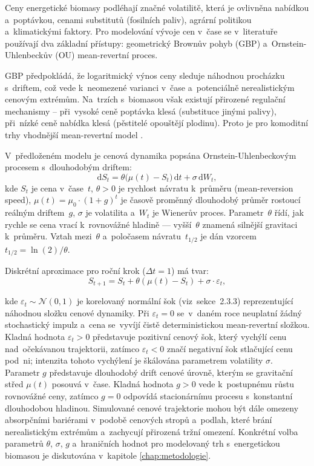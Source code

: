 Ceny energetické biomasy podléhají značné volatilitě, která je ovlivněna nabídkou a~poptávkou, cenami substitutů (fosilních paliv), agrární politikou a~klimatickými faktory. Pro modelování vývoje cen v~čase se v~literatuře používají dva základní přístupy: geometrický Brownův pohyb (GBP) a~Ornstein-Uhlenbeckův (OU) mean-revertní proces.

GBP předpokládá, že logaritmický výnos ceny sleduje náhodnou procházku s~driftem, což vede k~neomezené varianci v~čase a~potenciálně nerealistickým cenovým extrémům. Na~trzích s~biomasou však existují přirozené regulační mechanismy -- při~vysoké ceně poptávka klesá (substituce jinými palivy), při~nízké ceně nabídka klesá (pěstitelé opouštějí plodinu). Proto je pro komoditní trhy vhodnější mean-revertní model \cite{Hull2018}.

V~předloženém modelu je cenová dynamika popsána Ornstein-Uhlenbeckovým procesem s~dlouhodobým driftem:
\begin{equation}
    \mathrm{d}S_t = \theta\bigl(\mu(t) - S_t\bigr)\,\mathrm{d}t + \sigma\,\mathrm{d}W_t,
    \label{eq:ou-process}
\end{equation}
kde $S_t$ je cena v~čase~$t$, $\theta > 0$ je rychlost návratu 
k~průměru (mean-reversion speed), $\mu(t) = \mu_0 \cdot (1+g)^t$ 
je časově proměnný dlouhodobý průměr rostoucí reálným driftem~$g$, 
$\sigma$ je volatilita a~$W_t$ je Wienerův proces. Parametr~$\theta$ 
řídí, jak rychle se cena vrací k~rovnovážné hladině --- vyšší~$\theta$ 
znamená silnější gravitaci k~průměru. Vztah mezi~$\theta$ a~poločasem 
návratu~$t_{1/2}$ je dán vzorcem $t_{1/2} = \ln(2) / \theta$.

Diskrétní aproximace pro roční krok ($\Delta t = 1$) má tvar:
\begin{equation}
  S_{t+1} = S_t + \theta \left(\mu(t) - S_t\right) + \sigma \cdot \varepsilon_t,
  \label{eq:mean-reversion-discrete}
\end{equation}

kde $\varepsilon_t \sim \mathcal{N}(0,1)$ je korelovaný normální šok
(viz~sekce~2.3.3) reprezentující náhodnou složku cenové dynamiky.
Při $\varepsilon_t = 0$ se~v~daném roce neuplatní žádný stochastický
impulz a~cena se~vyvíjí čistě deterministickou mean-revertní složkou.
Kladná hodnota $\varepsilon_t > 0$ představuje pozitivní cenový šok,
který vychýlí cenu nad~očekávanou trajektorii, zatímco $\varepsilon_t < 0$
značí negativní šok stlačující cenu pod~ni; intenzita tohoto vychýlení
je škálována parametrem volatility $\sigma$.
Parametr $g$ představuje dlouhodobý drift cenové úrovně, kterým se
gravitační střed $\mu(t)$ posouvá v~čase. Kladná hodnota $g > 0$ vede
k~postupnému růstu rovnovážné ceny, zatímco $g = 0$ odpovídá stacionárnímu
procesu s~konstantní dlouhodobou hladinou. Simulované cenové trajektorie
mohou být dále omezeny absorpčními bariérami v~podobě cenových stropů
a~podlah, které brání nerealistickým extrémům a~zachycují přirozená
tržní omezení. Konkrétní volba parametrů $\theta$, $\sigma$, $g$ a~hraničních
hodnot pro modelovaný trh s~energetickou biomasou je diskutována
v~kapitole \ref{chap:metodologie}.


